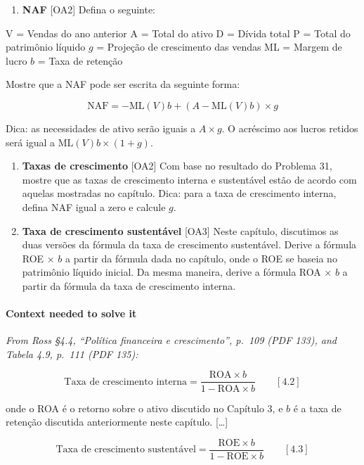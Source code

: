 \documentclass[11pt,a4paper]{article}
\providecommand{\tightlist}{\setlength{\itemsep}{0pt}\setlength{\parskip}{0pt}}
\begin{document}
\begin{enumerate}
\def\labelenumi{\arabic{enumi}.}
\setcounter{enumi}{30}
\tightlist
\item
  \textbf{NAF} {[}OA2{]} Defina o seguinte:
\end{enumerate}

V = Vendas do ano anterior A = Total do ativo D = Dívida total P = Total do patrimônio líquido \(g\)
= Projeção de crescimento das vendas ML = Margem de lucro \(b\) = Taxa de retenção

Mostre que a NAF pode ser escrita da seguinte forma:

\[\text{NAF} = -\text{ML}(V)b + (A - \text{ML}(V)b) \times g\]

Dica: as necessidades de ativo serão iguais a \(A \times g\). O acréscimo aos lucros retidos será
igual a \(\text{ML}(V)b \times (1 + g)\).

\begin{enumerate}
\def\labelenumi{\arabic{enumi}.}
\setcounter{enumi}{31}
\item
  \textbf{Taxas de crescimento} {[}OA2{]} Com base no resultado do Problema 31, mostre que as taxas
  de crescimento interna e sustentável estão de acordo com aquelas mostradas no capítulo. Dica: para
  a taxa de crescimento interna, defina NAF igual a zero e calcule \(g\).
\item
  \textbf{Taxa de crescimento sustentável} {[}OA3{]} Neste capítulo, discutimos as duas versões da
  fórmula da taxa de crescimento sustentável. Derive a fórmula ROE × \(b\) a partir da fórmula dada
  no capítulo, onde o ROE se baseia no patrimônio líquido inicial. Da mesma maneira, derive a
  fórmula ROA × \(b\) a partir da fórmula da taxa de crescimento interna.
\end{enumerate}

\paragraph{Context needed to solve it}

\emph{From Ross §4.4, ``Política financeira e crescimento'', p.~109 (PDF 133), and Tabela 4.9,
p.~111 (PDF 135):}

\[\text{Taxa de crescimento interna} = \frac{\text{ROA} \times b}{1 - \text{ROA} \times b} \qquad [4.2]\]

onde o ROA é o retorno sobre o ativo discutido no Capítulo 3, e \(b\) é a taxa de retenção discutida
anteriormente neste capítulo. {[}\ldots{]}

\[\text{Taxa de crescimento sustentável} = \frac{\text{ROE} \times b}{1 - \text{ROE} \times b} \qquad [4.3]\]
\end{document}
